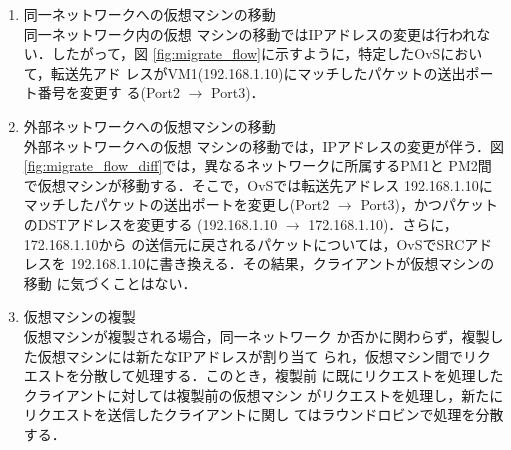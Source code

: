 \documentclass[submit,techrep]{ipsj}
\begin{document}

\begin{enumerate}
 \item 同一ネットワークへの仮想マシンの移動\\同一ネットワーク内の仮想
   マシンの移動ではIPアドレスの変更は行われない．したがって，図
   \ref{fig:migrate_flow}に示すように，特定したOvSにおいて，転送先アド
   レスがVM1(192.168.1.10)にマッチしたパケットの送出ポート番号を変更す
   る(Port2 $\rightarrow$ Port3)．


 \item 外部ネットワークへの仮想マシンの移動\\外部ネットワークへの仮想
   マシンの移動では，IPアドレスの変更が伴う．図
   \ref{fig:migrate_flow_diff}では，異なるネットワークに所属するPM1と
   PM2間で仮想マシンが移動する．そこで，OvSでは転送先アドレス
   192.168.1.10にマッチしたパケットの送出ポートを変更し(Port2
   $\rightarrow$ Port3)，かつパケットのDSTアドレスを変更する
   (192.168.1.10 $\rightarrow$ 172.168.1.10)．さらに，172.168.1.10から
   の送信元に戻されるパケットについては，OvSでSRCアドレスを
   192.168.1.10に書き換える．その結果，クライアントが仮想マシンの移動
   に気づくことはない．


 \item 仮想マシンの複製\\仮想マシンが複製される場合，同一ネットワーク
   か否かに関わらず，複製した仮想マシンには新たなIPアドレスが割り当て
   られ，仮想マシン間でリクエストを分散して処理する．このとき，複製前
   に既にリクエストを処理したクライアントに対しては複製前の仮想マシン
   がリクエストを処理し，新たにリクエストを送信したクライアントに関し
   てはラウンドロビンで処理を分散する．


\end{enumerate}
\end{document}
